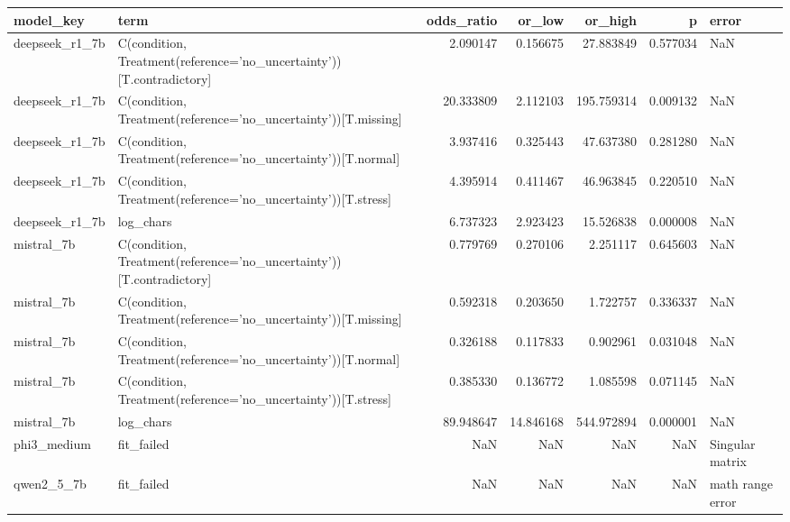 \begin{tabular}{llrrrrl}
\toprule
model\_key & term & odds\_ratio & or\_low & or\_high & p & error \\
\midrule
deepseek\_r1\_7b & C(condition, Treatment(reference='no\_uncertainty'))[T.contradictory] & 2.090147 & 0.156675 & 27.883849 & 0.577034 & NaN \\
deepseek\_r1\_7b & C(condition, Treatment(reference='no\_uncertainty'))[T.missing] & 20.333809 & 2.112103 & 195.759314 & 0.009132 & NaN \\
deepseek\_r1\_7b & C(condition, Treatment(reference='no\_uncertainty'))[T.normal] & 3.937416 & 0.325443 & 47.637380 & 0.281280 & NaN \\
deepseek\_r1\_7b & C(condition, Treatment(reference='no\_uncertainty'))[T.stress] & 4.395914 & 0.411467 & 46.963845 & 0.220510 & NaN \\
deepseek\_r1\_7b & log\_chars & 6.737323 & 2.923423 & 15.526838 & 0.000008 & NaN \\
mistral\_7b & C(condition, Treatment(reference='no\_uncertainty'))[T.contradictory] & 0.779769 & 0.270106 & 2.251117 & 0.645603 & NaN \\
mistral\_7b & C(condition, Treatment(reference='no\_uncertainty'))[T.missing] & 0.592318 & 0.203650 & 1.722757 & 0.336337 & NaN \\
mistral\_7b & C(condition, Treatment(reference='no\_uncertainty'))[T.normal] & 0.326188 & 0.117833 & 0.902961 & 0.031048 & NaN \\
mistral\_7b & C(condition, Treatment(reference='no\_uncertainty'))[T.stress] & 0.385330 & 0.136772 & 1.085598 & 0.071145 & NaN \\
mistral\_7b & log\_chars & 89.948647 & 14.846168 & 544.972894 & 0.000001 & NaN \\
phi3\_medium & fit\_failed & NaN & NaN & NaN & NaN & Singular matrix \\
qwen2\_5\_7b & fit\_failed & NaN & NaN & NaN & NaN & math range error \\
\bottomrule
\end{tabular}
